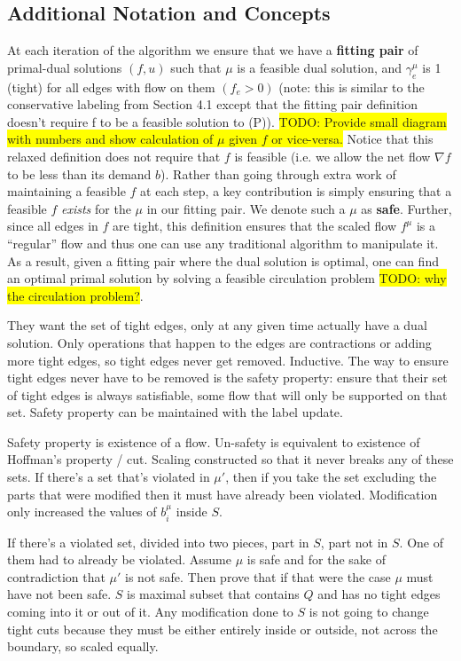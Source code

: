 \documentclass[11pt]{article}
\theoremstyle{definition}
\theoremstyle{definition}
\newcommand{\biu}{b_{i}^{\mu}}
\newcommand{\todo}[1]{\colorbox{yellow}{TODO: #1}}
\begin{document}
    \subsection{Additional Notation and Concepts}
At each iteration of the algorithm we ensure that we have a \textbf{fitting pair} of primal-dual solutions $(f,u)$ such that $\mu$ is a feasible dual solution, and $\gamma_e^{\mu}$ is 1 (tight) for all edges with flow on them $(f_e > 0)$ (note: this is similar to the conservative labeling from Section 4.1 except that the fitting pair definition doesn't require f to be a feasible solution to (P)). \todo{Provide small diagram with numbers and show calculation of $\mu$ given $f$ or vice-versa.} Notice that this relaxed definition does not require that $f$ is feasible (i.e. we allow the net flow $\nabla f $ to be less than its demand $b$). Rather than going through extra work of maintaining a feasible $f$ at each step, a key contribution is simply ensuring that a feasible $f$ \textit{exists} for the $\mu$ in our fitting pair. We denote such a $\mu$ as \textbf{safe}. Further, since all edges in $f$ are tight, this definition ensures that the scaled flow $f^{\mu}$ is a ``regular'' flow and thus one can use any traditional algorithm to manipulate it. As a result, given a fitting pair where the dual solution is optimal, one can find an optimal primal solution by solving a feasible circulation problem \todo{why the circulation problem?}. 

They want the set of tight edges, only at any given time actually have a dual solution. Only operations that happen to the edges are contractions or adding more tight edges, so tight edges never get removed. Inductive. The way to ensure tight edges never have to be removed is the safety property: ensure that their set of tight edges is always satisfiable, some flow that will only be supported on that set. Safety property can be maintained with the label update. 

Safety property is existence of a flow. Un-safety is equivalent to existence of Hoffman's property / cut. Scaling constructed so that it never breaks any of these sets. If there's a set that's violated in $\mu'$, then if you take the set excluding the parts that were modified then it must have already been violated. Modification only increased the values of $\biu$ inside $S$.

If there's a violated set, divided into two pieces, part in $S$, part not in $S$. One of them had to already be violated. Assume $\mu$ is safe and for the sake of contradiction that $\mu'$ is not safe. Then prove that if that were the case $\mu$ must have not been safe. 
$S$ is maximal subset that contains $Q$ and has no tight edges coming into it or out of it. Any modification done to $S$ is not going to change tight cuts because they must be either entirely inside or outside, not across the boundary, so scaled equally. 
\end{document}
